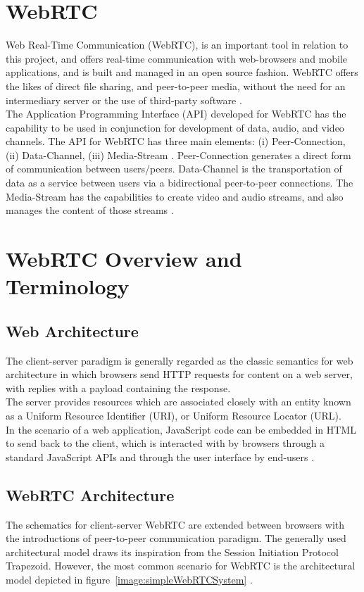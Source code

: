 \section{WebRTC}
\label{webRTCTR}
Web Real-Time Communication (WebRTC), is an important tool in relation to this project, and offers real-time communication with web-browsers and mobile applications, and is built and managed in an open source fashion. WebRTC offers the likes of direct file sharing, and peer-to-peer media, without the need for an intermediary server or the use of third-party software \cite{johnston2012webrtc}. 
\\The Application Programming Interface (API) developed for WebRTC has the capability to be used in conjunction for development of data, audio, and video channels. The API for WebRTC has three main elements: (i) Peer-Connection, (ii) Data-Channel, (iii) Media-Stream \cite{jesup2015webrtc}. Peer-Connection generates a direct form of communication between users/peers. Data-Channel is the transportation of data as a service between users via a bidirectional peer-to-peer connections. The Media-Stream has the capabilities  to create video and audio streams, and also manages the content of those streams \cite{14003034520191201}.

\section{WebRTC Overview and Terminology}
\subsection{Web Architecture}
The client-server paradigm is generally regarded as the classic semantics for web architecture in which browsers send HTTP requests for content on a web server, with replies with a payload containing the response.
\\The server provides resources which are associated closely with an entity known as a Uniform Resource Identifier (URI), or Uniform Resource Locator (URL).
\\ In the scenario of a web application, JavaScript code can be embedded in HTML to send back to the client, which is interacted with by browsers through a standard JavaScript APIs and through the user interface by end-users \cite{loreto2014real}.

\subsection{WebRTC Architecture}
The schematics for client-server WebRTC are extended between browsers with the introductions of peer-to-peer communication paradigm. The generally used architectural model draws its inspiration from the Session Initiation Protocol Trapezoid. However, the most common scenario for WebRTC is the architectural model depicted in figure~\ref{image:simpleWebRTCSystem} \cite{loreto2014real}.

